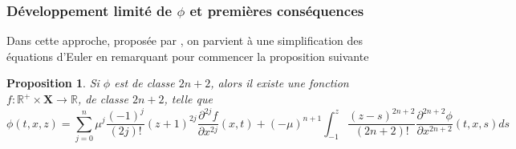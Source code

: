 \documentclass[12pt,a4paper]{article}
\newtheorem{prop}[dfn]{\textbf{Proposition}}
\numberwithin{equation}{section}
\begin{document}
\subsubsection{Développement limité de $\phi$ et premières conséquences}
Dans cette approche, proposée par \cite{MT}, on parvient à une simplification des équations d'Euler en remarquant pour commencer la proposition suivante
\begin{prop}
 
    Si $\phi$ est de classe $2n+2$, alors il existe une fonction $f:\mathbb{R}^+\times\textbf{X}\rightarrow \mathbb{R}$, de classe $2n+2$, telle que
    \begin{equation}
        \phi (t,x,z) = \sum_{j = 0}^{n} \mu^j\frac{(-1)^j}{(2j)!} (z+1)^{2j}\frac{\partial^{2j}f}{\partial x^{2j}}(x,t)
        + (-\mu)^{n+1}\int_{-1}^z\frac{(z-s)^{2n+2}}{(2n+2)!}\frac{\partial^{2n+2} \phi}{\partial x^{2n+2}}(t,x,s)ds
    \end{equation}
\end{prop}
\end{document}
